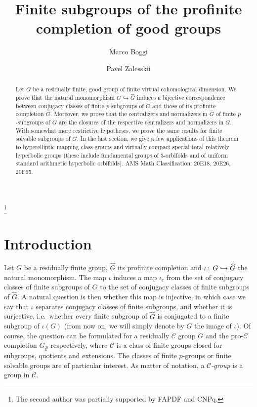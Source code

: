 \documentclass[12pt,twoside]{amsart}
\newcommand\hookra{\hookrightarrow}
\newcommand\cC{{\mathscr C}}
\newcommand\hG{{\widehat{G}}}
\def\co{\colon\thinspace}
\def\wC{{\widehat{\cC}}}
\theoremstyle{definition}
\begin{document}
 

\title{Finite subgroups of the profinite completion of good groups}

\author{Marco Boggi}
\address{UFF - Instituto de Matem\'atica e Estat\'{\i}stica -
Niter\'oi - RJ 24210-200; Brazil}

\author{Pavel Zalesskii}
\address{Departamento de Matem\'atica, Universidade de Bras\'{\i}lia, 
70910-900, Bras\'{\i}lia-DF; Brazil.} 
\thanks{The second author was partially supported  by FAPDF and CNPq.}

\begin{abstract}Let $G$ be a residually finite, good group of finite virtual cohomological dimension. 
We prove that  the natural monomorphism $G\hookra\hG$ induces a bijective correspondence 
between conjugacy classes of finite $p$-subgroups of $G$ and those of its profinite completion $\hG$.
Moreover, we prove that the centralizers and normalizers in $\hG$ of finite $p$-subgroups of $G$ 
are the closures of the respective centralizers and normalizers in $G$. 
With somewhat more restrictive hypotheses,  we prove the same results for finite solvable subgroups of $G$. 
In the last section, we give a few applications of this theorem to hyperelliptic mapping class groups and virtually 
compact special toral relatively hyperbolic groups (these include fundamental 
groups  of $3$-orbifolds and of uniform standard arithmetic hyperbolic orbifolds).
\vskip 0.2cm
\noindent AMS Math Classification: 20E18, 20E26, 20F65.

\end{abstract}

\maketitle

\section{Introduction}
Let $G$ be a residually finite group, $\hG$ its profinite completion and $\iota\co G\hookra\hG$ the natural 
monomorphism. The map $\iota$ induces a map $\iota_c$ from the set of conjugacy classes 
of finite subgroups of $G$ to the set of conjugacy classes of finite subgroups of $\hG$. A natural question is then whether this map
is injective, in which case we say that $\iota$ separates conjugacy classes of finite subgroups, and whether
it is surjective, i.e.\ whether every finite subgroup of $\hG$ is conjugated to a finite subgroup of $\iota(G)$
(from now on, we will simply denote by $G$ the image of $\iota$). Of course, the question can be formulated for a residually $\cC$ group $G$ and the
pro-$\cC$ completion $G_\wC$ respectively, where $\cC$ is a class of finite groups closed for subgroups, quotients and extensions. 
The classes of finite $p$-groups or finite solvable groups are of particular interest. As matter of notation, a \emph{$\cC$-group} is a group in $\cC$. 
\end{document}
